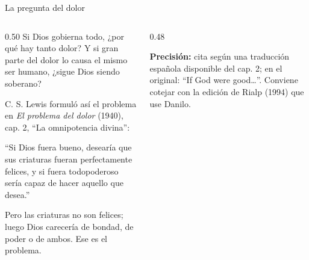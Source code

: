 \documentclass[hyperref={bookmarks=false},aspectratio=169]{beamer}
\newcommand{\precision}[1]{{\footnotesize\color{gris}\textbf{Precisión:} #1}}
\begin{document}
\begin{frame}{La pregunta del dolor}
\begin{columns}[c,onlytextwidth]
\begin{column}{0.50\textwidth}\small
Si Dios gobierna todo, ¿por qué hay tanto dolor? Y si gran parte del dolor lo causa el mismo ser humano, ¿sigue Dios siendo soberano?\par\medskip
C. S. Lewis formuló así el problema en \emph{El problema del dolor} (1940), cap. 2, ``La omnipotencia divina'':
\begin{tcolorbox}[colback=papiro,colframe=dorado,boxrule=1.2pt,arc=3pt]
\footnotesize ``Si Dios fuera bueno, desearía que sus criaturas fueran perfectamente felices, y si fuera todopoderoso sería capaz de hacer aquello que desea.''
\end{tcolorbox}
\scriptsize Pero las criaturas no son felices; luego Dios carecería de bondad, de poder o de ambos. Ese es el problema.
\end{column}
\begin{column}{0.48\textwidth}
\centering
{}\par\smallskip
\precision{cita según una traducción española disponible del cap. 2; en el original: ``If God were good\ldots''. Conviene cotejar con la edición de Rialp (1994) que use Danilo.}
\end{column}
\end{columns}
\end{frame}
\end{document}
